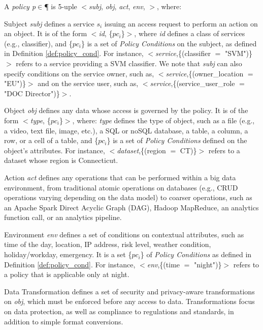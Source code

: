       \begin{definition}[Policy]\label{def:policy_rule}
        A {\it policy p}$\in$\P{} is 5-uple $<$\textit{subj}, \textit{obj}, \textit{act}, \textit{env}, \textit{\TP}$>$, where:
        \begin{description}
          \item Subject \textit{subj} defines a service $s_i$ issuing an access request to perform an action on an object. It is of the form $<$\emph{id}, \{$pc_i$\}$>$, where \emph{id} defines a class of services (e.g., classifier), and \{$pc_i$\} is a set of \emph{Policy Conditions} on the subject, as defined in Definition \ref{def:policy_cond}. For instance, $<$\emph{service},\{(classifier $=$ "SVM")\}$>$ refers to a service providing a SVM classifier. We note that \textit{subj} can also specify conditions on the service owner, such as, $<$\emph{service},\{(owner\_location $=$ "EU")\}$>$ and on the service user, such as, $<$\emph{service},\{(service\_user\_role $=$ "DOC Director")\}$>$.

          \item Object \textit{obj} defines any data whose access is governed by the policy. It is of the form $<$\emph{type}, \{$pc_i$\}$>$, where: \emph{type} defines the type of object, such as a file (e.g., a video, text file, image, etc.), a SQL or noSQL database, a table, a column, a row, or a cell of a table, and \{$pc_i$\} is a set of \emph{Policy Conditions} defined on the object's attributes. For instance, $<$\emph{dataset},\{(region $=$ CT)\}$>$ refers to a dataset whose region is Connecticut.

          \item Action \textit{act} defines any operations that can be performed within a big data environment, from traditional atomic operations on databases (e.g., CRUD operations varying depending on the data model) to coarser operations, such as an Apache Spark Direct Acyclic Graph (DAG), Hadoop MapReduce, an analytics function call, or an analytics pipeline.

          \item Environment \textit{env} defines a set of conditions on contextual attributes, such as time of the day, location, IP address, risk level, weather condition, holiday/workday, emergency. It is a set \{$pc_i$\} of \emph{Policy Conditions} as defined in Definition \ref{def:policy_cond}. For instance, $<$\emph{env},\{(time $=$ "night")\}$>$ refers to a policy that is applicable only at night.

          \item Data Transformation \textit{\TP} defines a set of security and privacy-aware transformations on \textit{obj}, which must be enforced before any access to data. Transformations focus on data protection, as well as compliance to regulations and standards, in addition to simple format conversions.
        \end{description}
      \end{definition}

